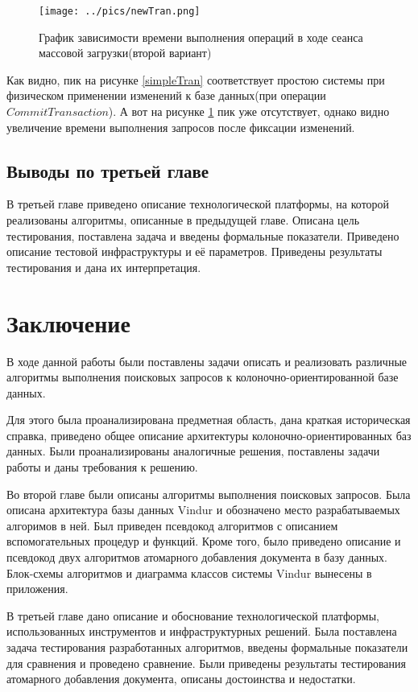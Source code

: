 \documentclass{matmex-diploma}
\begin{document}
        \begin{figure}[H]
            \centering
            \texttt{[image: ../pics/newTran.png]}
            \caption{График зависимости времени выполнения операций в ходе сеанса массовой загрузки(второй вариант)}
            \label{newTran}
        \end{figure}
        
        Как видно, пик на рисунке \ref{simpleTran} соответствует простою системы при физическом применении изменений к базе данных(при операции $CommitTransaction$). А вот на рисунке \ref{newTran} пик уже отсутствует, однако видно увеличение времени выполнения запросов после фиксации изменений.
        
        \subsection{Выводы по третьей главе}
            В третьей главе приведено описание технологической платформы, на которой реализованы алгоритмы, описанные в предыдущей главе. Описана цель тестирования, поставлена задача и введены формальные показатели. Приведено описание тестовой инфраструктуры и её параметров. Приведены результаты тестирования и дана их интерпретация. 
    
\section*{Заключение}
    В ходе данной работы были поставлены задачи описать и реализовать различные алгоритмы выполнения поисковых запросов к колоночно-ориентированной базе данных. %
    
    Для этого была проанализирована предметная область, дана краткая историческая справка, приведено общее описание архитектуры колоночно-ориентированных баз данных. Были проанализированы аналогичные решения, поставлены задачи работы и даны требования к решению.
    
    Во второй главе были описаны алгоритмы выполнения поисковых запросов. Была описана архитектура базы данных Vindur и обозначено место разрабатываемых алгоримов в ней. Был приведен псевдокод алгоритмов с описанием вспомогательных процедур и функций. Кроме того, было приведено описание и псевдокод двух алгоритмов атомарного добавления документа в базу данных. Блок-схемы алгоритмов и диаграмма классов системы Vindur вынесены в приложения.
    
    В третьей главе дано описание и обоснование технологической платформы, использованных инструментов и инфраструктурных решений. Была поставлена задача тестирования разработанных алгоритмов, введены формальные показатели для сравнения и проведено сравнение. Были приведены результаты тестирования атомарного добавления документа, описаны достоинства и недостатки.
    
\end{document}
